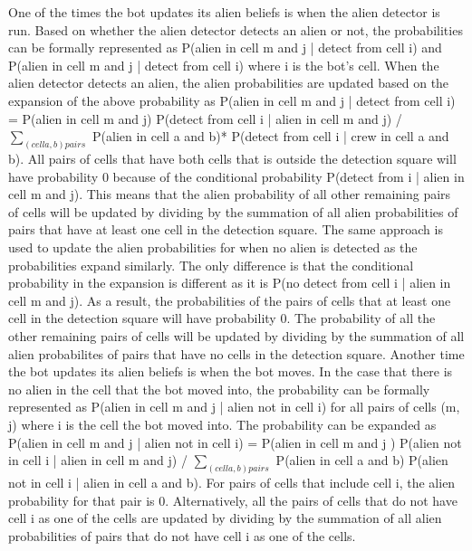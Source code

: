 \documentclass[11pt]{article}
\begin{document}
One of the times the bot updates its alien beliefs is when the alien detector is run. Based on whether the alien detector detects an alien or not, the probabilities can be formally represented as P(alien in cell m and j | detect from cell i) and P(alien in cell m and j | detect from cell i) where i is the bot's cell. When the alien detector detects an alien, the alien probabilities are updated based on the expansion of the above probability as P(alien in cell m and j | detect from cell i) = P(alien in cell m and j) P(detect from cell i | alien in cell m and j) / $\sum_{(cell a, b) pairs}$ P(alien in cell a and b)* P(detect from cell i | crew in cell a and b). All pairs of cells that have both cells that is outside the detection square will have probability 0 because of the conditional probability P(detect from i | alien in cell m and j). This means that the alien probability of all other remaining pairs of cells will be updated by dividing by the summation of all alien probabilities of pairs that have at least one cell in the detection square. The same approach is used to update the alien probabilities for when no alien is detected as the probabilities expand similarly. The only difference is that the conditional probability in the expansion is different as it is P(no detect from cell i | alien in cell m and j). As a result, the probabilities of the pairs of cells that at least one cell in the detection square will have probability 0. The probability of all the other remaining pairs of cells will be updated by dividing by the summation of all alien probabilites of pairs that have no cells in the detection square. 
\medskip
Another time the bot updates its alien beliefs is when the bot moves. In the case that there is no alien in the cell that the bot moved into, the probability can be formally represented as P(alien in cell m and j | alien not in cell i) for all pairs of cells (m, j) where i is the cell the bot moved into. The probability can be expanded as P(alien in cell m and j | alien not in cell i) = P(alien in cell m and j ) P(alien not in cell i | alien in cell m and j) / $\sum_{(cell a, b) pairs}$ P(alien in cell a and b) P(alien not in cell i | alien in cell a and b). For pairs of cells that include cell i, the alien probability for that pair is 0. Alternatively, all the pairs of cells that do not have cell i as one of the cells are updated by dividing by the summation of all alien probabilities of pairs that do not have cell i as one of the cells.
\medskip
\end{document}
